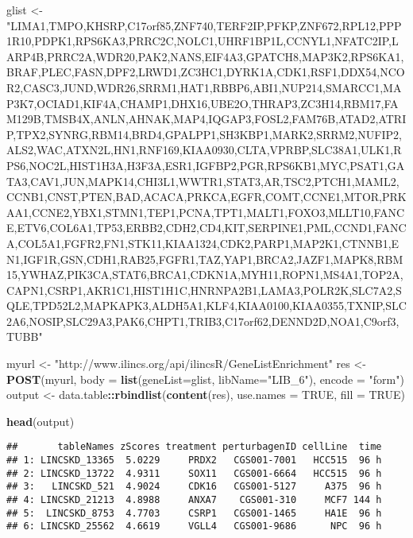 \documentclass[]{article}
\newenvironment{Shaded}{\begin{snugshade}}{\end{snugshade}}
\newcommand{\KeywordTok}[1]{\textcolor[rgb]{0.13,0.29,0.53}{\textbf{#1}}}
\newcommand{\DataTypeTok}[1]{\textcolor[rgb]{0.13,0.29,0.53}{#1}}
\newcommand{\StringTok}[1]{\textcolor[rgb]{0.31,0.60,0.02}{#1}}
\newcommand{\OtherTok}[1]{\textcolor[rgb]{0.56,0.35,0.01}{#1}}
\newcommand{\OperatorTok}[1]{\textcolor[rgb]{0.81,0.36,0.00}{\textbf{#1}}}
\newcommand{\NormalTok}[1]{#1}
\begin{document}
\begin{Shaded}
\begin{Highlighting}[]
\NormalTok{glist <-}\StringTok{ "LIMA1,TMPO,KHSRP,C17orf85,ZNF740,TERF2IP,PFKP,ZNF672,RPL12,PPP1R10,PDPK1,RPS6KA3,PRRC2C,NOLC1,UHRF1BP1L,CCNYL1,NFATC2IP,LARP4B,PRRC2A,WDR20,PAK2,NANS,EIF4A3,GPATCH8,MAP3K2,RPS6KA1,BRAF,PLEC,FASN,DPF2,LRWD1,ZC3HC1,DYRK1A,CDK1,RSF1,DDX54,NCOR2,CASC3,JUND,WDR26,SRRM1,HAT1,RBBP6,ABI1,NUP214,SMARCC1,MAP3K7,OCIAD1,KIF4A,CHAMP1,DHX16,UBE2O,THRAP3,ZC3H14,RBM17,FAM129B,TMSB4X,ANLN,AHNAK,MAP4,IQGAP3,FOSL2,FAM76B,ATAD2,ATRIP,TPX2,SYNRG,RBM14,BRD4,GPALPP1,SH3KBP1,MARK2,SRRM2,NUFIP2,ALS2,WAC,ATXN2L,HN1,RNF169,KIAA0930,CLTA,VPRBP,SLC38A1,ULK1,RPS6,NOC2L,HIST1H3A,H3F3A,ESR1,IGFBP2,PGR,RPS6KB1,MYC,PSAT1,GATA3,CAV1,JUN,MAPK14,CHI3L1,WWTR1,STAT3,AR,TSC2,PTCH1,MAML2,CCNB1,CNST,PTEN,BAD,ACACA,PRKCA,EGFR,COMT,CCNE1,MTOR,PRKAA1,CCNE2,YBX1,STMN1,TEP1,PCNA,TPT1,MALT1,FOXO3,MLLT10,FANCE,ETV6,COL6A1,TP53,ERBB2,CDH2,CD4,KIT,SERPINE1,PML,CCND1,FANCA,COL5A1,FGFR2,FN1,STK11,KIAA1324,CDK2,PARP1,MAP2K1,CTNNB1,EN1,IGF1R,GSN,CDH1,RAB25,FGFR1,TAZ,YAP1,BRCA2,JAZF1,MAPK8,RBM15,YWHAZ,PIK3CA,STAT6,BRCA1,CDKN1A,MYH11,ROPN1,MS4A1,TOP2A,CAPN1,CSRP1,AKR1C1,HIST1H1C,HNRNPA2B1,LAMA3,POLR2K,SLC7A2,SQLE,TPD52L2,MAPKAPK3,ALDH5A1,KLF4,KIAA0100,KIAA0355,TXNIP,SLC2A6,NOSIP,SLC29A3,PAK6,CHPT1,TRIB3,C17orf62,DENND2D,NOA1,C9orf3,TUBB"}
 
\NormalTok{myurl <-}\StringTok{ "http://www.ilincs.org/api/ilincsR/GeneListEnrichment"}
\NormalTok{res <-}\StringTok{ }\KeywordTok{POST}\NormalTok{(myurl, }\DataTypeTok{body =} \KeywordTok{list}\NormalTok{(}\DataTypeTok{geneList=}\NormalTok{glist, }\DataTypeTok{libName=}\StringTok{"LIB_6"}\NormalTok{), }\DataTypeTok{encode =} \StringTok{"form"}\NormalTok{)}
\NormalTok{output <-}\StringTok{ }\NormalTok{data.table}\OperatorTok{::}\KeywordTok{rbindlist}\NormalTok{(}\KeywordTok{content}\NormalTok{(res), }\DataTypeTok{use.names =} \OtherTok{TRUE}\NormalTok{, }\DataTypeTok{fill =} \OtherTok{TRUE}\NormalTok{)}

\KeywordTok{head}\NormalTok{(output)}
\end{Highlighting}
\end{Shaded}

\begin{verbatim}
##       tableNames zScores treatment perturbagenID cellLine  time
## 1: LINCSKD_13365  5.0229     PRDX2   CGS001-7001   HCC515  96 h
## 2: LINCSKD_13722  4.9311     SOX11   CGS001-6664   HCC515  96 h
## 3:   LINCSKD_521  4.9024     CDK16   CGS001-5127     A375  96 h
## 4: LINCSKD_21213  4.8988     ANXA7    CGS001-310     MCF7 144 h
## 5:  LINCSKD_8753  4.7703     CSRP1   CGS001-1465     HA1E  96 h
## 6: LINCSKD_25562  4.6619     VGLL4   CGS001-9686      NPC  96 h
\end{verbatim}
\end{document}
